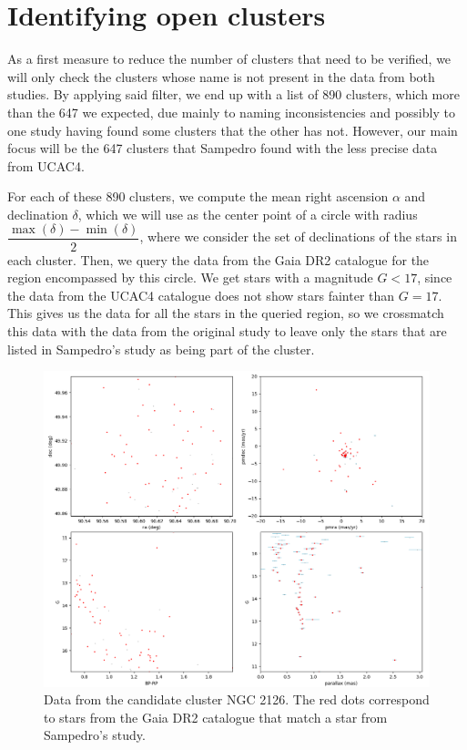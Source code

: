 \documentclass[twocolumn]{revtex4}
\begin{document}
\section{Identifying open clusters}

As a first measure to reduce the number of clusters that need to be verified, we will only check the clusters whose name is not present in the data from both studies. By applying said filter, we end up with a list of 890 clusters, which more than the 647 we expected, due mainly to naming inconsistencies and possibly to one study having found some clusters that the other has not. However, our main focus will be the 647 clusters that Sampedro found with the less precise data from UCAC4.

For each of these 890 clusters, we compute the mean right ascension $\alpha$ and declination $\delta$, which we will use as the center point of a circle with radius $\dfrac{\max(\delta) - \min(\delta)}{2}$, where we consider the set of declinations of the stars in each cluster. Then, we query the data from the Gaia DR2 catalogue for the region encompassed by this circle. We get stars with a magnitude $G < 17$, since the data from the UCAC4 catalogue does not show stars fainter than $G = 17$. This gives us the data for all the stars in the queried region, so we crossmatch this data with the data from the original study to leave only the stars that are listed in Sampedro's study as being part of the cluster.

\begin{figure}
\centering
\includegraphics[scale=0.5]{NGC_2126_crossmatch}
\caption{Data from the candidate cluster NGC 2126. The red dots correspond to stars from the Gaia DR2 catalogue that match a star from Sampedro's study.}
\label{crossmatched_data}
\end{figure}
\end{document}
